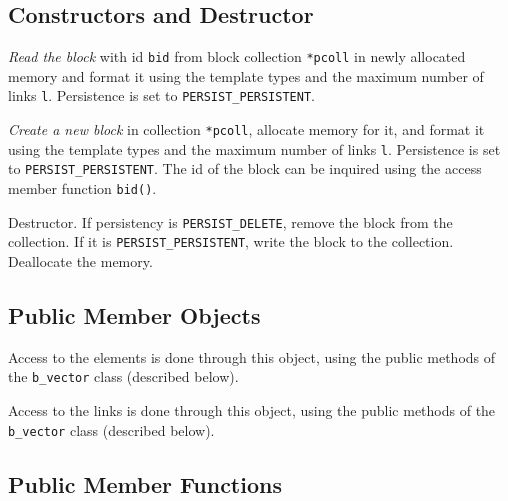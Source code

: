 \subsection{Constructors and Destructor}

   \btabb 

         {{\em Read the block} with id \lstinline|bid| from block collection
        \lstinline|*pcoll| in newly allocated memory and format it using the
        template types and the maximum number of links \lstinline|l|.
        Persistence is set to \lstinline|PERSIST_PERSISTENT|.}

         {{\em
        Create a new block} in collection \lstinline|*pcoll|, allocate memory for
        it, and format it using the template types and the maximum number
        of links \lstinline|l|. Persistence is set to \lstinline|PERSIST_PERSISTENT|. The id of the block can be inquired using the
        access member function \lstinline|bid()|.}

         {Destructor. If persistency 
        is \lstinline|PERSIST_DELETE|, remove the block from the collection. 
        If it is \lstinline|PERSIST_PERSISTENT|, write the block to the 
        collection. Deallocate the memory.}

   \etabb

\subsection{Public Member Objects}

   \btabb

         {Access to the elements is done through
        this object, using the public methods of the \lstinline|b_vector| class
        (described below).}

         {Access to the links is done
        through this object, using the public methods of the \lstinline|b_vector| class (described below).}

   \etabb

\subsection{Public Member Functions}

   \btabb
        
